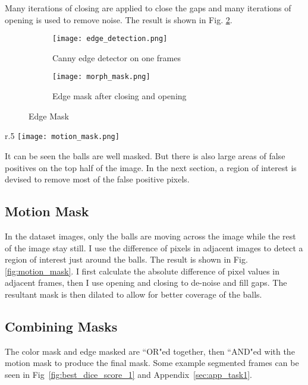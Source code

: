 \documentclass{report}
\begin{document}
Many iterations of closing are applied to close the gaps and many iterations of opening is used to remove noise. The result is shown in Fig. \ref{fig:morph_mask}.

\begin{figure}[ht]
    \centering
    \begin{subfigure}[b]{0.49\textwidth}
        \centering
        \texttt{[image: edge\_detection.png]}
        \caption{Canny edge detector on one frames}
        \label{fig:edge_mask}
    \end{subfigure}
    \begin{subfigure}[b]{0.49\textwidth}
        \centering
        \texttt{[image: morph\_mask.png]}
        \caption{Edge mask after closing and opening}
        \label{fig:morph_mask}
    \end{subfigure}
    \caption{Edge Mask}
    \label{fig:edge_masks}
\end{figure}

\begin{wrapfigure}{r}{.5\textwidth}
    \centering
    \texttt{[image: motion\_mask.png]}
    \caption{Motion mask applied to one of the frames}
    \label{fig:motion_mask}
\end{wrapfigure}

It can be seen the balls are well masked. But there is also large areas of false positives on the top half of the image. In the next section, a region of interest is devised to remove most of the false positive pixels.

\subsection{Motion Mask}

In the dataset images, only the balls are moving across the image while the rest of the image stay still. I use the difference of pixels in adjacent images to detect a region of interest just around the balls. The result is shown in Fig. \ref{fig:motion_mask}. I first calculate the absolute difference of pixel values in adjacent frames, then I use opening and closing to de-noise and fill gaps. The resultant mask is then dilated to allow for better coverage of the balls.

\subsection{Combining Masks}

The color mask and edge masked are ``OR"ed together, then ``AND"ed with the motion mask to produce the final mask. Some example segmented frames can be seen in Fig~\ref{fig:best_dice_score_1} and Appendix~\ref{sec:app_task1}.
\end{document}
